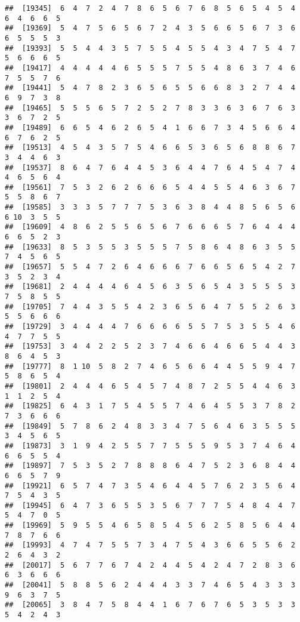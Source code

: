 \documentclass[
]{book}
\begin{document}
\begin{verbatim}
##  [19345]  6  4  7  2  4  7  8  6  5  6  7  6  8  5  6  5  4  5  4  6  4  6  6  5
##  [19369]  5  4  7  5  6  5  6  7  2  4  3  5  6  6  5  6  7  3  6  6  5  5  5  3
##  [19393]  5  5  4  4  3  5  7  5  5  4  5  5  4  3  4  7  5  4  7  5  6  6  6  5
##  [19417]  4  4  4  4  4  6  5  5  5  7  5  5  4  8  6  3  7  4  6  7  5  5  7  6
##  [19441]  5  4  7  8  2  3  6  5  6  5  5  6  6  8  3  2  7  4  4  6  9  7  3  8
##  [19465]  5  5  5  6  5  7  2  5  2  7  8  3  3  6  3  6  7  6  3  3  6  7  2  5
##  [19489]  6  6  5  4  6  2  6  5  4  1  6  6  7  3  4  5  6  6  4  6  7  6  2  5
##  [19513]  4  5  4  3  5  7  5  4  6  6  5  3  6  5  6  8  8  6  7  3  4  4  6  3
##  [19537]  8  6  4  7  6  4  4  5  3  6  4  4  7  6  4  5  4  7  4  4  6  5  6  4
##  [19561]  7  5  3  2  6  2  6  6  6  5  4  4  5  5  4  6  3  6  7  5  5  8  6  7
##  [19585]  3  3  3  5  7  7  7  5  3  6  3  8  4  4  8  5  6  5  6  6 10  3  5  5
##  [19609]  4  8  6  2  5  5  6  5  6  7  6  6  6  5  7  6  4  4  4  6  6  5  2  3
##  [19633]  8  5  3  5  5  3  5  5  5  7  5  8  6  4  8  6  3  5  5  7  4  5  6  5
##  [19657]  5  5  4  7  2  6  4  6  6  6  7  6  6  5  6  5  4  2  7  3  5  2  3  4
##  [19681]  2  4  4  4  4  6  4  5  6  3  5  6  5  4  3  5  5  5  3  7  5  8  5  5
##  [19705]  7  4  4  3  5  5  4  2  3  6  5  6  4  7  5  5  2  6  3  5  5  6  6  6
##  [19729]  3  4  4  4  4  7  6  6  6  6  5  5  7  5  3  5  5  4  6  4  7  7  5  5
##  [19753]  3  4  4  2  2  5  2  3  7  4  6  6  4  6  6  5  4  4  3  8  6  4  5  3
##  [19777]  8  1 10  5  8  2  7  4  6  5  6  6  4  4  5  5  9  4  7  5  8  6  5  4
##  [19801]  2  4  4  4  6  5  4  5  7  4  8  7  2  5  5  4  4  6  3  1  1  2  5  4
##  [19825]  6  4  3  1  7  5  4  5  5  7  4  6  4  5  5  3  7  8  2  7  3  6  6  6
##  [19849]  5  7  8  6  2  4  8  3  3  4  7  5  6  4  6  3  5  5  5  3  4  5  6  5
##  [19873]  3  1  9  4  2  5  5  7  7  5  5  5  9  5  3  7  4  6  4  6  6  5  5  4
##  [19897]  7  5  3  5  2  7  8  8  8  6  4  7  5  2  3  6  8  4  4  6  6  5  7  9
##  [19921]  6  5  7  4  7  3  5  4  6  4  4  5  7  6  2  3  5  6  4  7  5  4  3  5
##  [19945]  6  4  7  3  6  5  5  3  5  6  7  7  7  5  4  8  4  4  7  5  4  7  0  5
##  [19969]  5  9  5  5  4  6  5  8  5  4  5  6  2  5  8  5  6  4  4  7  8  7  6  6
##  [19993]  4  7  4  7  5  5  7  3  4  7  5  4  3  6  6  5  5  6  2  2  6  4  3  2
##  [20017]  5  6  7  7  6  7  4  2  4  4  5  4  2  4  7  2  8  3  6  6  3  6  6  6
##  [20041]  5  8  8  5  6  2  4  4  4  3  3  7  4  6  5  4  3  3  3  9  6  3  7  5
##  [20065]  3  8  4  7  5  8  4  4  1  6  7  6  7  6  5  3  5  3  3  5  4  2  4  3

\end{verbatim}
\end{document}
